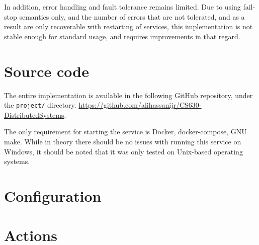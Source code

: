 \documentclass[sigconf]{acmart}
\begin{document}
In addition, error handling and fault tolerance remains limited. Due to using fail-stop semantics only, and the number of
errors that are not tolerated, and as a result are only recoverable with restarting of services, this implementation is not
stable enough for standard usage, and requires improvements in that regard.





\clearpage

\appendix

\section{Source code}
\label{supp:sourcecode}
The entire implementation is available in the following GitHub repository, under the \verb|project/| directory.
\url{https://github.com/alihassanijr/CS630-DistributedSystems}.

The only requirement for starting the service is Docker, docker-compose, GNU make.
While in theory there should be no issues with running this service on Windows, it should be noted that it was only tested on 
Unix-based operating systems.

\section{Configuration}
\label{supp:configurations}

\section{Actions}
\label{supp:actions}
\end{document}
